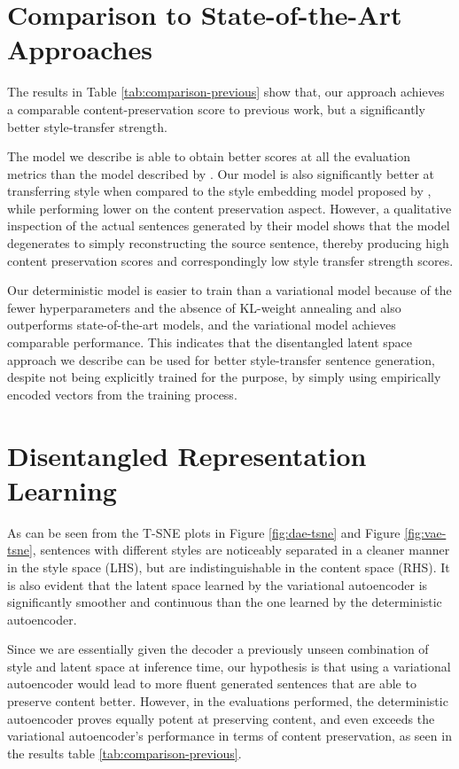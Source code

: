 \section{Comparison to State-of-the-Art Approaches}

The results in Table \ref{tab:comparison-previous} show that, our approach achieves a comparable content-preservation score to previous work, but a significantly better style-transfer strength.

The model we describe is able to obtain better scores at all the evaluation metrics than the model described by \cite{shen2017style}. Our model is also significantly better at transferring style when compared to the style embedding model proposed by \cite{fu2017style}, while performing lower on the content preservation aspect. However, a qualitative inspection of the actual sentences generated by their model shows that the model degenerates to simply reconstructing the source sentence, thereby producing high content preservation scores and correspondingly low style transfer strength scores.

Our deterministic model is easier to train than a variational model because of the fewer hyperparameters and the absence of KL-weight annealing  and also outperforms state-of-the-art models, and the variational model achieves comparable performance. This indicates that the disentangled latent space approach we describe can be used for better style-transfer sentence generation, despite not being explicitly trained for the purpose, by simply using empirically encoded vectors from the training process.


\section{Disentangled Representation Learning}

As can be seen from the T-SNE plots in Figure \ref{fig:dae-tsne} and Figure \ref{fig:vae-tsne}, sentences with different styles are noticeably separated in a cleaner manner in the style space (LHS), but are indistinguishable in the content space (RHS). It is also evident that the latent space learned by the variational autoencoder is significantly smoother and continuous than the one learned by the deterministic autoencoder.

Since we are essentially given the decoder a previously unseen combination of style and latent space at inference time, our hypothesis is that using a variational autoencoder would lead to more fluent generated sentences that are able to preserve content better. However, in the evaluations performed, the deterministic autoencoder proves equally potent at preserving content, and even exceeds the variational autoencoder's performance in terms of content preservation, as seen in the results table \ref{tab:comparison-previous}.


